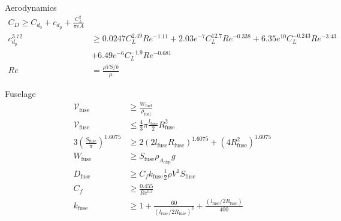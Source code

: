 \documentclass{beamer}
\begin{document}
\begin{frame}
\begin{columns}
\begin{itemize}
{{    \item Aerodynamics
        \begin{align*}
        C_D \geq C_{d_0} + c_{d_p} + \frac{C_L^2}{\pi e A} \\
        c_{d_p}^{3.72} &\geq 0.0247C_L^{2.49}Re^{-1.11} + 2.03e^{-7}C_L^{12.7}Re^{-0.338} + 6.35e^{10}C_L^{-0.243}Re^{-3.43} \nonumber \\
                       &+ 6.49e^{-6}C_L^{-1.9}Re^{-0.681} \\
        Re &= \frac{\rho V S/b}{\mu}
        \end{align*}

    \item Fuselage
        \begin{align*}
            \mathcal{V}_{\text{fuse}} &\geq \frac{W_{\text{fuel}}}{\rho_{\text{fuel}}} \\
            \mathcal{V}_{\text{fuse}} & \leq \frac{4}{3}\pi \frac{l_{\text{fuse}}}{2}R_{\text{fuse}}^2 \\
            3 \left( \frac{S_{\text{fuse}}}{\pi} \right)^{1.6075} &\geq 2(2l_{\text{fuse}}R_{\text{fuse}})^{1.6075} + (4R_{\text{fuse}}^2)^{1.6075} \\
            W_{\text{fuse}} &\geq S_{\text{fuse}} \rho_{A_{\text{cfrp}}} g \\
        D_{\text{fuse}} &\geq C_f k_{\text{fuse}} \frac{1}{2} \rho V^2 S_{\text{fuse}} \\
        C_f &\geq \frac{0.455}{Re^{0.3}}\\
            k_{\text{fuse}} &\geq 1 + \frac{60}{(l_{\text{fuse}}/2R_{\text{fuse}})^3} + \frac{(l_{\text{fuse}}/2R_{\text{fuse}})}{400}
        \end{align*}


}}
    \end{itemize}
    

\end{columns}
\end{frame}
\end{document}
